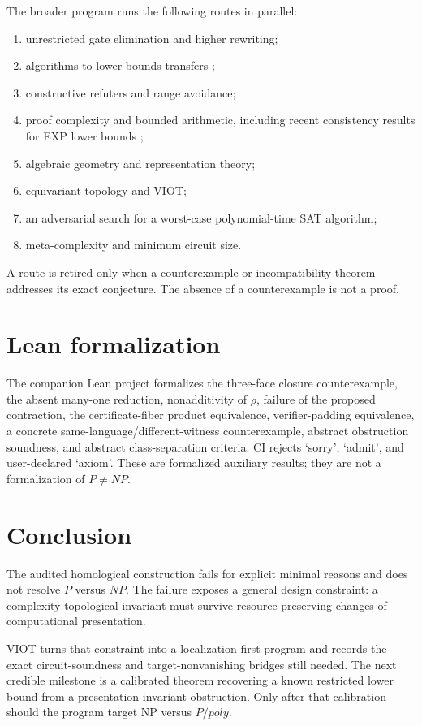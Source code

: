 \documentclass[11pt]{article}
\theoremstyle{definition}
\begin{document}
The broader program runs the following routes in parallel:
\begin{enumerate}[leftmargin=*]
\item unrestricted gate elimination and higher rewriting;
\item algorithms-to-lower-bounds transfers \cite{Williams};
\item constructive refuters and range avoidance;
\item proof complexity and bounded arithmetic, including recent consistency
results for EXP lower bounds \cite{AM};
\item algebraic geometry and representation theory;
\item equivariant topology and VIOT;
\item an adversarial search for a worst-case polynomial-time SAT algorithm;
\item meta-complexity and minimum circuit size.
\end{enumerate}
A route is retired only when a counterexample or incompatibility theorem
addresses its exact conjecture. The absence of a counterexample is not a
proof.

\section{Lean formalization}

The companion Lean project formalizes the three-face closure counterexample,
the absent many-one reduction, nonadditivity of \(\rho\), failure of the
proposed contraction, the certificate-fiber product equivalence,
verifier-padding equivalence, a concrete same-language/different-witness
counterexample, abstract obstruction soundness, and abstract class-separation
criteria. CI rejects `sorry', `admit', and user-declared `axiom'. These are
formalized auxiliary results; they are not a formalization of \(P\ne NP\).

\section{Conclusion}

The audited homological construction fails for explicit minimal reasons and
does not resolve \(P\) versus \(NP\). The failure exposes a general design
constraint: a complexity-topological invariant must survive
resource-preserving changes of computational presentation.

VIOT turns that constraint into a localization-first program and records the
exact circuit-soundness and target-nonvanishing bridges still needed. The next
credible milestone is a calibrated theorem recovering a known restricted
lower bound from a presentation-invariant obstruction. Only after that
calibration should the program target NP versus \(P/poly\).
\end{document}

